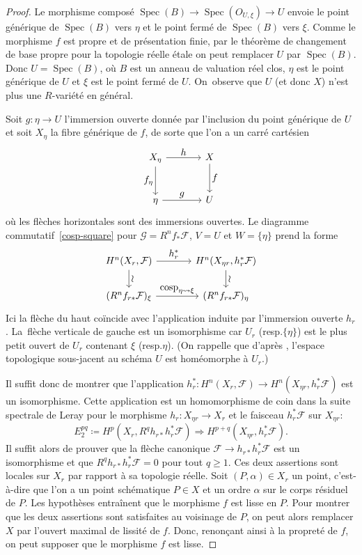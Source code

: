 \documentclass[11pt]{article}
\newcommand{\resp}{resp.\xspace}
\let\ts\textstyle
\theoremstyle{definition}
\newcommand{\Spec}{\operatorname{Spec}}
\newcommand{\mc}[1]{\mathcal{#1}}
\newcommand{\on}[1]{\operatorname{#1}}
\begin{document}
\begin{proof}
Le morphisme composé $\Spec(B) \to \on{Spec}(O_{U,\xi})\to U$ envoie le point générique de $\on{Spec}(B)$ vers $\eta$ et le point fermé de $\on{Spec}(B)$ vers $\xi$. Comme le morphisme $f$ est propre et de présentation finie, par le théorème de changement de base propre pour la topologie réelle étale \cite[Th.\,16.2(a), $t=ret$]{scheiderer1994real} on peut remplacer $U$ par $\Spec(B)$. Donc $U = \Spec(B)$, où $B$ est un anneau de valuation réel clos, $\eta$ est le point générique de $U$ et $\xi$ est le point fermé de $U$. On~observe que $U$ (et donc $X$) n'est plus une $R$\nobreakdash-variété en général.

Soit $g\colon \eta \to U$ l'immersion ouverte donnée par l'inclusion du point générique de $U$ et soit $X_\eta$ la fibre générique de $f$, de sorte que l'on a un carré cartésien
\[
\begin{tikzcd}[column sep = large,row sep = large]
X_\eta \arrow[r,"\ts h"] \arrow[d,swap,"\ts f_\eta"] & X \arrow[d,"\ts f"] \\
\eta \arrow[r,"\ts g"] & U
\end{tikzcd}
\]
où les flèches horizontales sont des immersions ouvertes. Le diagramme commutatif~\eqref{cosp-square} pour $\mc{G}=R^nf_*\mc{F}$, $V=U$ et $W=\{\eta\}$ prend la forme\vspace*{-5pt}
\[
\begin{tikzcd}[column sep = large]
H^n(X_r, \mc{F}) \arrow[r,"\ts h_r^*"] \arrow[d,"\ts \wr"] & H^n(X_{\eta r}, h_r^* \mc{F}) \arrow[d,"\ts \wr"] \\
(R^n f_{r*} \mc{F})_{\xi} \arrow[r,"\ts \on{cosp}_{\eta\leadsto\xi}"] & (R^n f_{r*} \mc{F})_{\eta}
\end{tikzcd}
\]
Ici la flèche du haut coïncide avec l'application induite par l'immersion ouverte $h_r$. La~flèche verticale de gauche est un isomorphisme car $U_r$ (\resp $\{\eta\}$) est le plus petit ouvert de $U_r$ contenant $\xi$ (\resp $\eta$). (On rappelle que d'après \cite[(1.5)]{scheiderer1994real}, l'espace topologique sous-jacent au schéma $U$ est homéomorphe à $U_r$.)

Il suffit donc de montrer que l'application $h_r^*\colon H^n(X_r, \mc{F})\to H^n(X_{\eta r}, h_r^* \mc{F})$ est un isomorphisme. Cette application est un homomorphisme de coin dans la suite spectrale de Leray pour le morphisme $h_r\colon X_{\eta r}\to X_r$ et le faisceau $h_r^*\mc{F}$ sur $X_{\eta r}$:\vspace*{-3pt}
\[E_2^{pq}\coloneqq H^p(X_r,R^qh_{r*}h_r^{*}\mc{F})\Longrightarrow H^{p+q}(X_{\eta r},h_r^*\mc{F}).\]
Il suffit alors de prouver que la flèche canonique
$\mc{F} \to h_{r*}h_r^* \mc{F}$ est un isomorphisme et que $R^q h_{r*} h_r^* \mc{F} = 0$ pour tout $q\geq 1$.
Ces deux assertions sont locales sur $X_r$ par rapport à sa topologie réelle.
Soit $(P,\alpha)\in X_r$ un point, c'est-à-dire que l'on a un point schématique $P\in X$ et un ordre $\alpha$ sur le corps résiduel de $P$. Les hypothèses entraînent que le morphisme $f$ est lisse en $P$. Pour montrer que les deux assertions sont satisfaites au voisinage de $P$, on peut alors remplacer $X$ par l'ouvert maximal de lissité de $f$. Donc, renonçant ainsi à la propreté de $f$, on peut supposer que le morphisme $f$ est lisse.


\end{proof}
\end{document}
